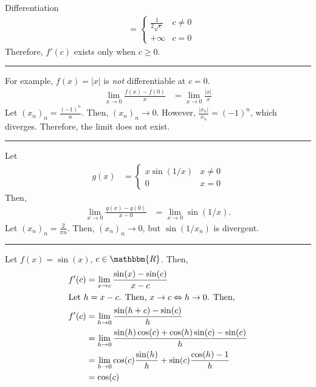 \documentclass[10pt]{extarticle}
\newcommand{\R}{\mathbbm{R}}
\begin{document}
\begin{problem}{Differentiation}
\begin{align*}
                                                    &= \begin{cases}
                                                      \frac{1}{2\sqrt{c}} & c \neq 0\\
                                                      +\infty & c = 0
                                                    \end{cases}
    \end{align*}
    Therefore, $f'(c)$ exists only when $c\geq 0$.\\
    \vspace{4pt}
    \rule{\textwidth}{0.4pt}
    \vspace{4pt}
    For example, $f(x) = |x|$ is \textit{not} differentiable at $c=0$.
    \begin{align*}
      \lim_{x\rightarrow 0}\frac{f(x) - f(0)}{x} &= \lim_{x\rightarrow 0}\frac{|x|}{x}
    \end{align*}
    Let $(x_n)_n = \frac{(-1)^n}{n}$. Then, $(x_n)_n \rightarrow 0$. However, $\frac{|x_n|}{x_n} = (-1)^{n}$, which diverges. Therefore, the limit does not exist.\\
    \vspace{4pt}
    \rule{\textwidth}{0.4pt}
    \vspace{4pt}
    Let
    \begin{align*}
      g(x) &= \begin{cases}
        x\sin(1/x) & x\neq 0\\
        0 & x=0
      \end{cases}
    \end{align*}
    Then,
    \begin{align*}
      \lim_{x\rightarrow 0} \frac{g(x) - g(0)}{x-0} &= \lim_{x\rightarrow 0}\sin(1/x).
    \end{align*}
    Let $(x_n)_n = \frac{2}{\pi n}$. Then, $(x_n)_n \rightarrow 0$, but $\sin(1/x_n)$ is divergent.\\
    \vspace{4pt}
    \rule{\textwidth}{0.4pt}
    \vspace{4pt}
    Let $f(x) = \sin(x)$, $c\in\R$. Then,
    \begin{align*}
      f'(c) &= \lim_{x\rightarrow c} \frac{\sin(x) - \sin(c)}{x-c}\\
      \shortintertext{Let $h = x-c$. Then, $x\rightarrow c \Leftrightarrow h\rightarrow 0$. Then,}
      f'(c) &= \lim_{h\rightarrow 0}\frac{\sin(h+c) - \sin(c)}{h}\\
            &= \lim_{h\rightarrow 0}\frac{\sin(h)\cos(c) + \cos(h)\sin(c) - \sin(c)}{h}\\
            &= \lim_{h\rightarrow 0}\cos(c)\frac{\sin(h)}{h} + \sin(c)\frac{\cos(h) - 1}{h}\\
            &= \cos(c)
    \end{align*}
  \end{problem}
\end{document}
